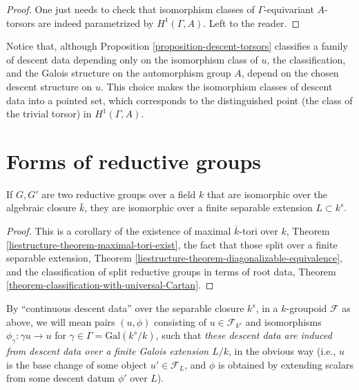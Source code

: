 \begin{proof}
 One just needs to check that isomorphism classes of $\Gamma$-equivariant $A$-torsors are indeed parametrized by $H^1(\Gamma, A)$. Left to the reader.
\end{proof}



\begin{remark}
 \label{remark-torsors-base-point}
Notice that, although Proposition \ref{proposition-descent-torsors} classifies a family of descent data depending only on the isomorphism class of $u$, the classification, and the Galois structure on the automorphism group $A$, depend on the chosen descent structure on $u$. This choice makes the isomorphism classes of descent data into a pointed set, which corresponds to the distinguished point (the class of the trivial torsor) in $H^1(\Gamma, A)$.
\end{remark}




\section{Forms of reductive groups}
\label{section-forms-reductive}

\begin{lemma}
 \label{lemma-reductive-isomorphic-separable}
If $G, G'$ are two reductive groups over a field $k$ that are isomorphic over the algebraic closure $\bar k$, they are isomorphic over a finite separable extension $L\subset k^s$.
\end{lemma}

\begin{proof}
 This is a corollary of the existence of maximal $\bar k$-tori over $k$, Theorem \ref{liestructure-theorem-maximal-tori-exist}, the fact that those split over a finite separable extension, Theorem \ref{liestructure-theorem-diagonalizable-equivalence}, and the classification of split reductive groups in terms of root data, Theorem \ref{theorem-classification-with-universal-Cartan}.
\end{proof}

By ``continuous descent data'' over the separable closure $k^s$, in a $k$-groupoid $\mathcal F$ as above, we will mean pairs $(u,\phi)$ consisting of $u\in \mathcal F_{k^s}$ and isomorphisms $\phi_\gamma: \gamma u \to u$ for $\gamma\in\Gamma = \text{Gal}(k^s/k)$, such that \emph{these descent data are induced from descent data over a finite Galois extension $L/k$}, in the obvious way (i.e., $u$ is the base change of some object $u'\in \mathcal F_L$, and $\phi$ is obtained by extending scalars from some descent datum $\phi'$ over $L$).


